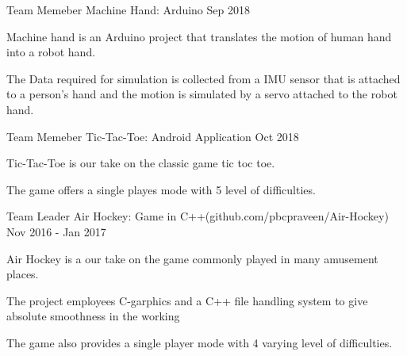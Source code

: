 \begin{cventries}
\cventry
    {Team Memeber}
    {Machine Hand: Arduino}
    {}
    {Sep 2018}
    {
     \begin{cvitems} %
        \item {Machine hand is an Arduino project that translates the motion of human hand into a robot hand. }
        \item{The Data required for simulation is collected from a IMU sensor that is attached to a person's hand and the motion is simulated by a servo attached to the robot hand.}
      \end{cvitems}
    }



\cventry
    {Team Memeber}
    {Tic-Tac-Toe: Android Application}
    {}
    {Oct 2018}
    {
     \begin{cvitems} %
        \item {Tic-Tac-Toe is our take on the classic game tic toc toe. }
        \item{The game offers a single playes mode with 5 level of difficulties.}
      \end{cvitems}
    }



\cventry
    {Team Leader}
    {Air Hockey: Game in C++({\tiny github.com/pbcpraveen/Air-Hockey})}
    {}
    {Nov 2016 - Jan 2017}
    {
     \begin{cvitems} %
        \item {Air Hockey is a our take on the game commonly played in many amusement places.}
        \item{The project employees C-garphics and a C++ file handling system to give absolute smoothness in the working }
           \item{The game also provides a single player mode with 4 varying level of difficulties.}
      \end{cvitems}
    }



\end{cventries}